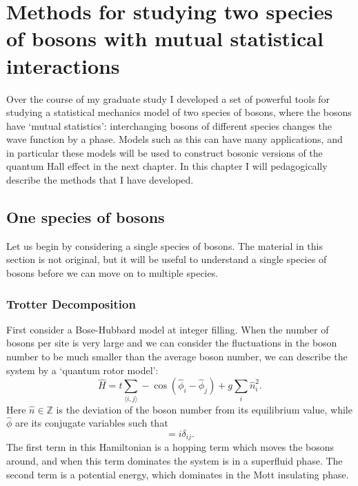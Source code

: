 \chapter{Methods for studying two species of bosons with mutual statistical interactions}
\label{chapter::methods}

Over the course of my graduate study I developed a set of powerful tools for studying a statistical mechanics model of two species of bosons, where the bosons have `mutual statistics': interchanging bosons of different species changes the wave function by a phase. Models such as this can have many applications, and in particular these models will be used to construct bosonic versions of the quantum Hall effect in the next chapter. In this chapter I will pedagogically describe the methods that I have developed.

\section{One species of bosons}
\label{section::single}
Let us begin by considering a single species of bosons. The material in this section is not original, but it will be useful to understand a single species of bosons before we can move on to multiple species.

\subsection{Trotter Decomposition}
\label{subsec::trotter}
First consider a Bose-Hubbard model at integer filling. When the number of bosons per site is very large and we can consider the fluctuations in the boson number to be much smaller than the average boson number, we can describe the system by a `quantum rotor model':
\begin{equation}
\hat{H}=t\sum_{\langle i,j \rangle} -\cos(\hat\phi_i-\hat\phi_j) + g\sum_i \hat n_i^2.
\label{singleHam}
\end{equation}
Here $\hat n\in \mathbb{Z}$ is the deviation of the boson number from its equilibrium value, while $\hat\phi$ are its conjugate variables such that 
\begin{equation}
[\hat n_i, \hat\phi_j]=i\delta_{ij}.
\label{commute}
\end{equation}
The first term in this Hamiltonian is a hopping term which moves the bosons around, and when this term dominates the system is in a superfluid phase. The second term is a potential energy, which dominates in the Mott insulating phase. 

